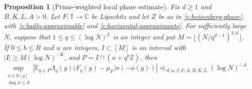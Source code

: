 \documentclass[12pt]{amsart}
\newcommand{\1}{\mathbf 1}
\newcommand{\e}{\mathrm e}
\newtheorem{proposition}[theorem]{Proposition}
\theoremstyle{definition}
\begin{document}
\begin{proposition}[Prime-weighted local phase estimate]
\label{p:prime-phase}
Fix $d\geq1$ and $B,K,L,A>0$. Let $F:\mathbb T\to\mathbb C$
be Lipschitz and let $Z$ be as in \eqref{e:heisenberg-phase}, with
\eqref{e:badly-approximable} and \eqref{e:horizontal-approximants}.
For sufficiently large $N$, suppose that $1\leq q\leq(\log N)^L$
is an integer and put $M=\lfloor(N/q^{d-1})^{1/d}\rfloor$.
If $0\leq b\leq B$ and $u$ are integers, $I\subset[M]$ is an interval
with $|I|\geq M(\log N)^{-K}$, and $P=I\cap(u+q^b\mathbb Z)$, then
\begin{equation}\label{e:prime-local-phase}
 \sup_{\substack{\phi\in\mathbb R[y]\\\deg\phi\leq d}}
 \left|\mathbb E_{y\in P}\Lambda_q(y)
       \bigl(F_q(y)-\mu_F\bigr)\e(-\phi(y))\right|
 \ll_{d,\alpha,\beta,F,A,B,K,L}(\log N)^{-A}.
\end{equation}
\end{proposition}
\end{document}
